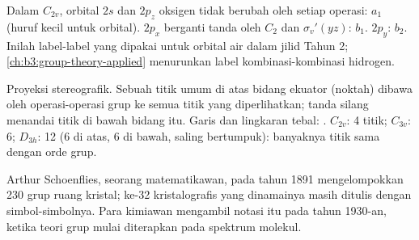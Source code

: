 \begin{example}\label{ex:b3:point-groups:water-orbitals}
Dalam $C_{2v}$, orbital $2s$ dan $2p_z$ oksigen tidak berubah oleh setiap
operasi: $a_1$ (huruf kecil untuk orbital). $2p_x$ berganti tanda oleh $C_2$
dan $\sigma_v'(yz)$: $b_1$. $2p_y$: $b_2$. Inilah label-label yang dipakai untuk
orbital air dalam jilid Tahun 2; \cref{ch:b3:group-theory-applied}
menurunkan label kombinasi-kombinasi hidrogen.
\end{example}

\begin{omfigure}

{\small Proyeksi stereografik. Sebuah titik umum di atas bidang ekuator
(noktah) dibawa oleh operasi-operasi grup ke semua titik yang diperlihatkan;
tanda silang menandai titik di bawah bidang itu. Garis dan lingkaran tebal:
. $C_{2v}$: 4 titik; $C_{3v}$: 6; $D_{3h}$: 12 (6 di atas, 6 di
bawah, saling bertumpuk): banyaknya titik sama dengan orde grup.}
\end{omfigure}

\begin{history}
Arthur Schoenflies, seorang matematikawan, pada tahun 1891 mengelompokkan
230 grup ruang kristal; ke-32  kristalografis yang dinamainya
masih ditulis dengan simbol-simbolnya. Para kimiawan mengambil notasi itu
pada tahun 1930-an, ketika teori grup mulai diterapkan pada spektrum
molekul.
\end{history}

